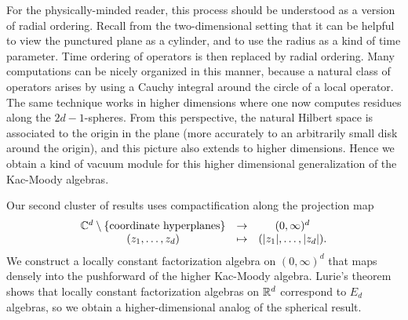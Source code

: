 For the physically-minded reader, 
this process should be understood as a version of radial ordering.
Recall from the two-dimensional setting that it can be helpful to view the punctured plane as a cylinder,
and to use the radius as a kind of time parameter.
Time ordering of operators is then replaced by radial ordering.
Many computations can be nicely organized in this manner,
because a natural class of operators arises by using a Cauchy integral around the circle of a local operator.
The same technique works in higher dimensions where one now computes residues along the $2d-1$-spheres.
From this perspective, the natural Hilbert space is associated to the origin in the plane
(more accurately to an arbitrarily small disk around the origin),
and this picture also extends to higher dimensions.
Hence we obtain a kind of vacuum module for this higher dimensional generalization of the Kac-Moody algebras.

Our second cluster of results uses compactification along the projection map
\[
\begin{array}{ccc}
\mathbb C^d \setminus \{\text{coordinate hyperplanes}\} & \to & (0,\infty)^d \\
(z_1,\ldots,z_d) & \mapsto & (|z_1|,\ldots,|z_d|).
\end{array}
\]
We construct a locally constant factorization algebra on $(0,\infty)^d$ that maps densely into the pushforward of the higher Kac-Moody algebra. 
Lurie's theorem shows that locally constant factorization algebras on $\mathbb R^d$ correspond to $E_d$ algebras,
so we obtain a higher-dimensional analog of the spherical result.

